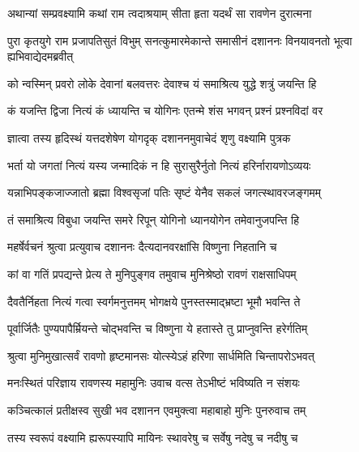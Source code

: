 

\addtocounter{shlokacount}{28}

\twolineshloka
{अथान्यां सम्प्रवक्ष्यामि कथां राम त्वदाश्रयाम्}
{सीता हृता यदर्थं सा रावणेन दुरात्मना} %

\threelineshloka
{पुरा कृतयुगे राम प्रजापतिसुतं विभुम्}
{सनत्कुमारमेकान्ते समासीनं दशाननः}
{विनयावनतो भूत्वा ह्यभिवाद्येदमब्रवीत्} %

\twolineshloka
{को न्वस्मिन् प्रवरो लोके देवानां बलवत्तरः}
{देवाश्च यं समाश्रित्य युद्धे शत्रुं जयन्ति हि} %

\twolineshloka
{कं यजन्ति द्विजा नित्यं कं ध्यायन्ति च योगिनः}
{एतन्मे शंस भगवन् प्रश्नं प्रश्नविदां वर} %

\twolineshloka
{ज्ञात्वा तस्य हृदिस्थं यत्तदशेषेण योगदृक्}
{दशाननमुवाचेदं शृणु वक्ष्यामि पुत्रक} %

\twolineshloka
{भर्ता यो जगतां नित्यं यस्य जन्मादिकं न हि}
{सुरासुरैर्नुतो नित्यं हरिर्नारायणोऽव्ययः} %

\twolineshloka
{यन्नाभिपङ्कजाज्जातो ब्रह्मा विश्वसृजां पतिः}
{सृष्टं येनैव सकलं जगत्स्थावरजङ्गमम्} %

\twolineshloka
{तं समाश्रित्य विबुधा जयन्ति समरे रिपून्}
{योगिनो ध्यानयोगेन तमेवानुजपन्ति हि} %

\twolineshloka
{महर्षेर्वचनं श्रुत्वा प्रत्युवाच दशाननः}
{दैत्यदानवरक्षांसि विष्णुना निहतानि च} %

\twolineshloka
{कां वा गतिं प्रपद्यन्ते प्रेत्य ते मुनिपुङ्गव}
{तमुवाच मुनिश्रेष्ठो रावणं राक्षसाधिपम्} %

\twolineshloka
{दैवतैर्निहता नित्यं गत्वा स्वर्गमनुत्तमम्}
{भोगक्षये पुनस्तस्माद्भ्रष्टा भूमौ भवन्ति ते} %

\twolineshloka
{पूर्वार्जितैः पुण्यपापैर्म्रियन्ते चोद्भवन्ति च}
{विष्णुना ये हतास्ते तु प्राप्नुवन्ति हरेर्गतिम्} %

\twolineshloka
{श्रुत्वा मुनिमुखात्सर्वं रावणो हृष्टमानसः}
{योत्स्येऽहं हरिणा सार्धमिति चिन्तापरोऽभवत्} %

\twolineshloka
{मनःस्थितं परिज्ञाय रावणस्य महामुनिः}
{उवाच वत्स तेऽभीष्टं भविष्यति न संशयः} %

\twolineshloka
{कञ्चित्कालं प्रतीक्षस्व सुखी भव दशानन}
{एवमुक्त्वा महाबाहो मुनिः पुनरुवाच तम्} %

\twolineshloka
{तस्य स्वरूपं वक्ष्यामि ह्यरूपस्यापि मायिनः}
{स्थावरेषु च सर्वेषु नदेषु च नदीषु च} %

